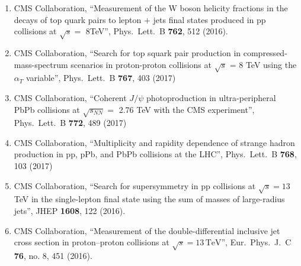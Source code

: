 \begin{enumerate}
\item CMS Collaboration, ``Measurement of the W boson helicity fractions in the decays of top quark pairs to lepton $+$ jets final states produced in pp collisions at $\sqrt s=$ 8TeV'', Phys.\ Lett.\ B {\bf 762}, 512 (2016).

\item CMS Collaboration, ``Search for top squark pair production in compressed-mass-spectrum scenarios in proton-proton collisions at $\sqrt{s}$ = 8 TeV using the $\alpha_T$ variable'', Phys.\ Lett.\ B {\bf 767}, 403 (2017)

\item CMS Collaboration, ``Coherent $J/\psi$ photoproduction in ultra-peripheral PbPb collisions at $\sqrt {s_{NN}} =$ 2.76 TeV with the CMS experiment'', Phys.\ Lett.\ B {\bf 772}, 489 (2017)

\item CMS Collaboration, ``Multiplicity and rapidity dependence of strange hadron production in pp, pPb, and PbPb collisions at the LHC'', Phys.\ Lett.\ B {\bf 768}, 103 (2017)

\item CMS Collaboration, ``Search for supersymmetry in pp collisions at $ \sqrt{s}=13 $ TeV in the single-lepton final state using the sum of masses of large-radius jets'', JHEP {\bf 1608}, 122 (2016).

\item CMS Collaboration, ``Measurement of the double-differential inclusive jet cross section in proton–proton collisions at $\sqrt{s} = 13\,\text {TeV} $'', Eur.\ Phys.\ J.\ C {\bf 76}, no. 8, 451 (2016).


\end{enumerate}

